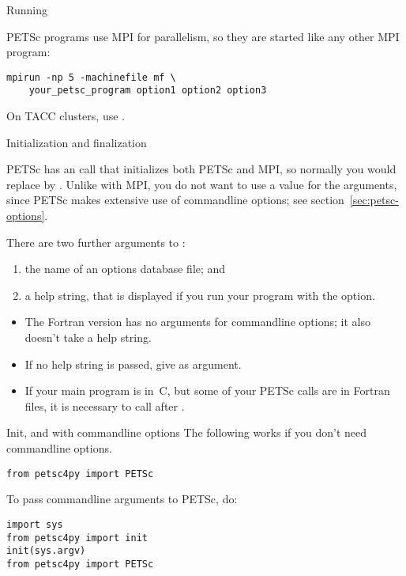  {Running}

PETSc programs use MPI for parallelism, so they are started like any other
MPI program:
\begin{verbatim}
mpirun -np 5 -machinefile mf \
    your_petsc_program option1 option2 option3
\end{verbatim}
\begin{taccnote}
  On TACC clusters, use .
\end{taccnote}

 {Initialization and finalization}
\label{sec:petscinit}

PETSc has an call that initializes both PETSc and MPI, so normally you
would replace \indexmpishow{MPI_Init} by
.
Unlike with MPI, you do not want to
use a  value for the  arguments, since PETSc
makes extensive use of commandline options; see
section~\ref{sec:petsc-options}.


There are two further arguments to :
\begin{enumerate}
\item the name of an options database file; and
\item a help string, that is displayed if you run your program with the  option.
\end{enumerate}

\begin{fortrannote}
  \begin{itemize}
  \item
    The Fortran version has no arguments for commandline options;
    it also doesn't take a help string.
  \item If no help string is passed, give  as argument.
  \item If your main program is in~C, but some of your PETSc calls are
    in Fortran files, it is necessary to call
     after
    .
  \end{itemize}
\end{fortrannote}

\begin{pythonnote}{Init, and with commandline options}
  The following works if you don't need commandline options.
\begin{verbatim}
from petsc4py import PETSc
\end{verbatim}
To pass commandline arguments to PETSc, do:
\begin{verbatim}
import sys
from petsc4py import init
init(sys.argv)
from petsc4py import PETSc
\end{verbatim}
\end{pythonnote}

